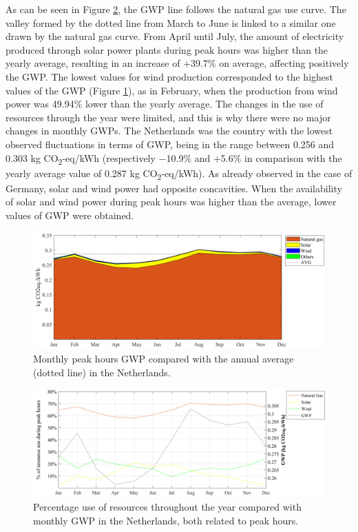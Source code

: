 {{ As can be seen in Figure \ref{COMP_NL}, the GWP line follows the natural gas use curve. The valley formed by the dotted line from March to June is linked to a similar one drawn by the natural gas curve. From April until July, the amount of electricity produced through solar power plants during peak hours was higher than the yearly average, resulting in an increase of {+39.7\% on average}, affecting positively the GWP. The lowest values for wind production corresponded to the highest values of the GWP (Figure \ref{GWP_NL}), {as in February, when the production from wind power was 49.94\% lower than the yearly average}. The changes in the use of  resources through the year were limited, and this is why there were no major changes in monthly GWPs. {The Netherlands was the country with the lowest observed fluctuations in terms of GWP, being in the range between 0.256 and 0.303 kg CO\textsubscript2-eq/kWh (respectively $-$10.9\% and +5.6\% in comparison with the yearly average value of 0.287 kg CO\textsubscript2-eq/kWh). As already observed in the case of Germany, solar and wind power had opposite concavities. When the availability of solar and wind power during peak hours was higher than the average, lower values of GWP were obtained.} 
 

\begin{figure}[htbp]
	\centering
	\includegraphics[width=1\textwidth]{ChapterLCA/Images/GWP_plots/Netherlands_GWP.png}
	\caption{Monthly peak hours GWP compared with the annual average (dotted line) in the Netherlands.}
	\label{GWP_NL}
\end{figure}
	
\begin{figure}[htbp]
	\centering
	\includegraphics[width=1\textwidth]{ChapterLCA/Images/GWP_plots/Comp_GWP_NL.png}
	\caption{Percentage use of resources throughout the year compared with monthly GWP in the Netherlands, both related to peak hours.}
	\label{COMP_NL}
\end{figure}


}}
